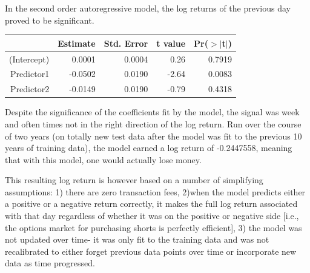 \documentclass{article}
\begin{document}
In the second order autoregressive model, the log returns of the previous day proved to be significant.
\begin{table}[ht]
\begin{center}
\begin{tabular}{rrrrr}
  \hline
 & Estimate & Std. Error & t value & Pr($>$$|$t$|$) \\ 
  \hline
(Intercept) & 0.0001 & 0.0004 & 0.26 & 0.7919 \\ 
  Predictor1 & -0.0502 & 0.0190 & -2.64 & 0.0083 \\ 
  Predictor2 & -0.0149 & 0.0190 & -0.79 & 0.4318 \\ 
   \hline
\end{tabular}
\end{center}
\end{table} 
Despite the significance of the coefficients fit by the model, the signal was week and often times not in the right direction of the log return.  Run over the course of two years (on totally new test data after the model was fit to the previous 10 years of training data), the model earned a log return of -0.2447558, meaning that with this model, one would actually lose money.

This resulting log return is however based on a number of simplifying assumptions: 1) there are zero transaction fees, 2)when the model predicts either a positive or a negative return correctly, it makes the full log return associated with that day regardless of whether it was on the positive or negative side [i.e., the options market for purchasing shorts is perfectly efficient], 3) the model was not updated over time- it was only fit to the training data and was not recalibrated to either forget previous data points over time or incorporate new data as time progressed.
\end{document}
